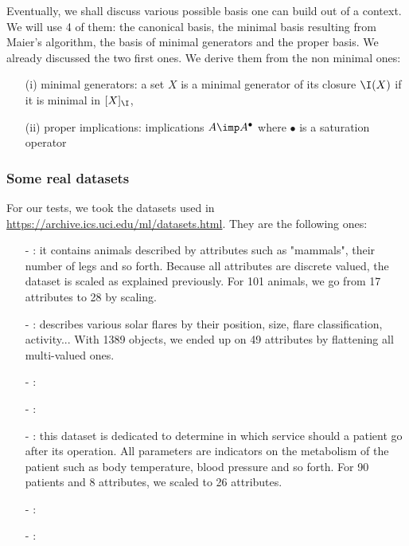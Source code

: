 \vspace{1.2em}

Eventually, we shall discuss various possible basis one can build out of a context. We will use 4 of them: the canonical basis, the minimal basis resulting from Maier's algorithm, the basis of minimal generators and the
proper basis. We already discussed the two first ones. We derive them from the
non minimal ones:
\begin{itemize}
	\item[(i)] minimal generators: a set $X$ is a minimal generator of its closure $\I(X)$ if it is minimal in $[ X]_{\I}$,
	\item[(ii)] proper implications: implications $A \imp A^{\bullet}$ where 
	$\bullet$ is a saturation operator 
\end{itemize}


\subsubsection{Some real datasets}

For our tests, we took the datasets used in \cite{bazhanov_optimizations_2014} \url{https://archive.ics.uci.edu/ml/datasets.html}. They are the following ones:
\begin{itemize}
	\item[-] : it contains animals described by attributes such as "mammals", their number of legs and so forth. Because all attributes are discrete valued, the dataset is scaled as explained previously. For 101 animals, we go from 17 attributes to 28 by scaling.
	\item[-] : describes various solar flares by their position, size, flare classification, activity... With 1389 objects, we ended up on 49 attributes by flattening all multi-valued ones.
	\item[-] :
	\item[-] :
	\item[-] : this dataset is dedicated to determine in which service should a patient go after its operation. All parameters are indicators on the metabolism of the patient such as body temperature,
	blood pressure and so forth. For 90 patients and 8 attributes, we scaled
	to 26 attributes.
	\item[-] :
	\item[-] :
\end{itemize}

